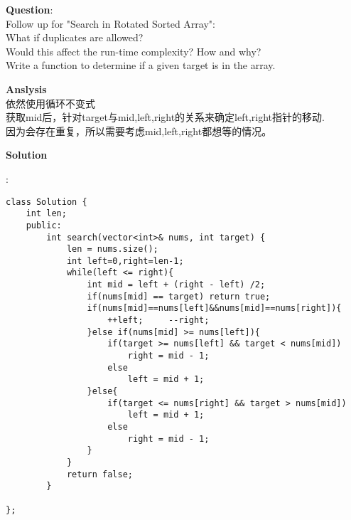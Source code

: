 \begin{description}
    \item{\textbf{Question}}:\\%
		Follow up for "Search in Rotated Sorted Array":\\
		What if duplicates are allowed?\\
		Would this affect the run-time complexity? How and why?\\
		Write a function to determine if a given target is in the array.\\

    \item{\textbf{Anslysis}}\\
		依然使用循环不变式\\
		获取mid后，针对target与mid,left,right的关系来确定left,right指针的移动.\\
		因为会存在重复，所以需要考虑mid,left,right都想等的情况。\\

    \item{\textbf{Solution}}\\
	\item{} : \\
		\begin{lstlisting}
class Solution {
	int len;
	public:
		int search(vector<int>& nums, int target) {
			len = nums.size();
			int left=0,right=len-1;
			while(left <= right){
				int mid = left + (right - left) /2;
				if(nums[mid] == target)	return true;
				if(nums[mid]==nums[left]&&nums[mid]==nums[right]){
					++left;		--right;
				}else if(nums[mid] >= nums[left]){
					if(target >= nums[left] && target < nums[mid])
						right = mid - 1;
					else 
						left = mid + 1;
				}else{
					if(target <= nums[right] && target > nums[mid])
						left = mid + 1;
					else 
						right = mid - 1;
				}
			}
			return false;
		}

};
		\end{lstlisting}
\end{description}

